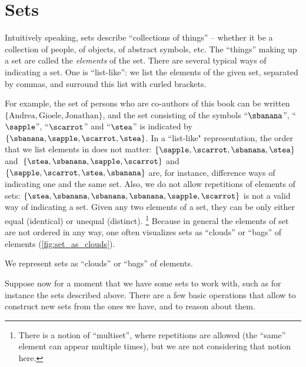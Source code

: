 
\section{Sets}

Intuitively speaking, sets describe ``collections of things'' -- whether it be a collection of people, of objects, of abstract symbols, etc.
The ``things'' making up a set are called the \emph{elements} of the set.
There are several typical ways of indicating a set.
One is ``list-like'': we list the elements of the given set, separated by commas, and surround this list with curled brackets.

For example, the set of persons who are co-authors of this book can be written~$\{ \text{Andrea}, \text{Gioele}, \text{Jonathan} \}$, and the set consisting of the symbols ``$\sbanana$'', ``$\sapple$'', ``$\scarrot$'' and ``$\stea$'' is indicated by $\{ \sbanana, \sapple, \scarrot, \stea \}$.
In a ``list-like" representation, the order that we list elements in does not matter:
$\{ \sapple, \scarrot, \sbanana, \stea \}$ and~$\{ \stea, \sbanana, \sapple, \scarrot\}$ and~$\{ \sapple, \scarrot, \stea, \sbanana \}$ are, for instance, difference ways of indicating one and the same set.
Also, we do not allow repetitions of elements of sets:
$\{ \stea, \sbanana, \sbanana, \sbanana, \sapple, \scarrot \}$ is not a valid way of indicating a set.
Given any two elements of a set, they can be only either equal (identical) or unequal (distinct).
\footnote{There is a notion of ``multiset'', where repetitions are allowed (the ``same'' element can appear multiple times), but we are not considering that notion here.}
Because in general the elements of set are not ordered in any way, one often visualizes sets as ``clouds'' or ``bags'' of elements (\cref{fig:set_as_clouds}).

\begin{marginfigure}
	\begin{center}
	\end{center}
	\caption{We represent sets as ``clouds'' or ``bags'' of elements. \label{fig:set_as_clouds}}
\end{marginfigure}

Suppose now for a moment that we have some sets to work with, such as for instance the sets described above.
There are a few basic operations that allow to construct new sets from the ones we have, and to reason about them.

